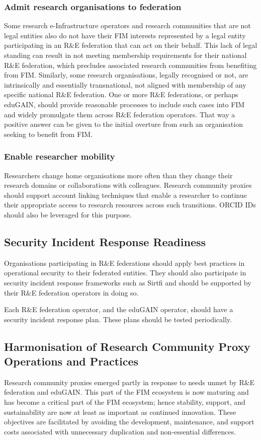 \documentclass[fleqn,10pt]{wlscirep}
\begin{document}
{\subsubsection{Admit research organisations to federation}
Some research e-Infrastructure operators and research communities that are not legal entities also do not have their FIM interests represented by a legal entity participating in an R\&E federation that can act on their behalf. This lack of legal standing can result in not meeting membership requirements for their national R\&E federation, which precludes associated research communities from benefiting from FIM. Similarly, some research organisations, legally recognised or not, are intrinsically and essentially transnational, not aligned with membership of any specific national R\&E federation. One or more R\&E federations, or perhaps eduGAIN, should provide reasonable processes to include such cases into FIM and widely promulgate them across R\&E federation operators. That way a positive answer can be given to the initial overture from such an organisation seeking to benefit from FIM.

\subsubsection{Enable researcher mobility}
Researchers change home organisations more often than they change their research domains or collaborations with colleagues. Research community proxies should support account linking techniques that enable a researcher to continue their appropriate access to research resources across such transitions. ORCID IDs should also be leveraged for this purpose.

\subsection{Security Incident Response Readiness}
Organisations participating in R\&E federations should apply best practices in operational security to their federated entities. They should also participate in security incident response frameworks such as Sirtfi and should be supported by their R\&E federation operators in doing so.

Each R\&E federation operator, and the eduGAIN operator, should have a security incident response plan. These plans should be tested periodically.

\subsection{Harmonisation of Research Community Proxy Operations and Practices}
Research community proxies emerged partly in response to needs unmet by R\&E federation and eduGAIN. This part of the FIM ecosystem is now maturing and has become a critical part of the FIM ecosystem; hence stability, support, and sustainability are now at least as important as continued innovation. These objectives are facilitated by avoiding the development, maintenance, and support costs associated with unnecessary duplication and non-essential differences.

}
\end{document}
